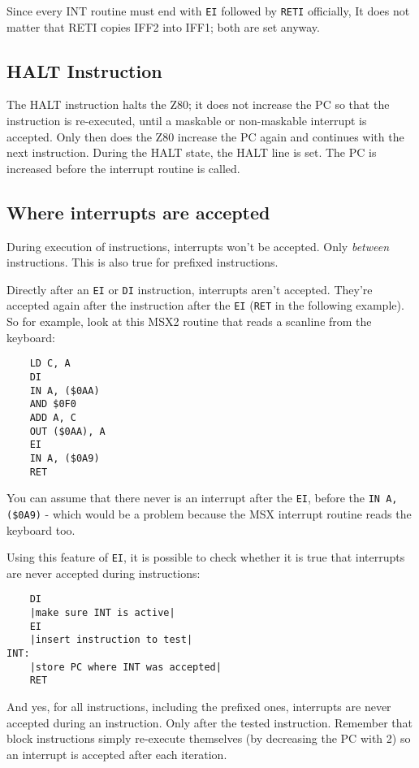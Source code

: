 \documentclass[12pt,twoside,openright,a4paper]{book}
\begin{document}
Since every INT routine must end with {\tt EI} followed by {\tt RETI} officially, It does not matter that RETI copies IFF2 into IFF1; both are set anyway.


\subsection{HALT Instruction}

The HALT instruction halts the Z80; it does not increase the PC so that the instruction is re-executed, until a maskable or non-maskable interrupt is accepted. Only then does the Z80 increase the PC again and continues with the next instruction. During the HALT state, the HALT line is set. The PC is increased before the interrupt routine is called.


\subsection{Where interrupts are accepted}

During execution of instructions, interrupts won't be accepted. Only {\em between} instructions. This is also true for prefixed instructions.

Directly after an {\tt EI} or {\tt DI} instruction, interrupts aren't accepted. They're accepted again after the instruction after the {\tt EI} ({\tt RET} in the following example). So for example, look at this MSX2 routine that reads a scanline from the keyboard:

\begin{lstlisting}
	LD C, A
	DI
	IN A, ($0AA)
	AND $0F0
	ADD A, C
	OUT ($0AA), A
	EI
	IN A, ($0A9)
	RET
\end{lstlisting}

You can assume that there never is an interrupt after the {\tt EI}, before the {\tt IN A,(\$0A9)} - which would be a problem because the MSX interrupt routine reads the keyboard too.

\pagebreak
Using this feature of {\tt EI}, it is possible to check whether it is true that interrupts are never accepted during instructions:

\begin{lstlisting}
	DI
	|make sure INT is active|
	EI
	|insert instruction to test|
INT:
	|store PC where INT was accepted|
	RET
\end{lstlisting}

And yes, for all instructions, including the prefixed ones, interrupts are never accepted during an instruction. Only after the tested instruction. Remember that block instructions simply re-execute themselves (by decreasing the PC with 2) so an interrupt is accepted after each iteration.
\end{document}
